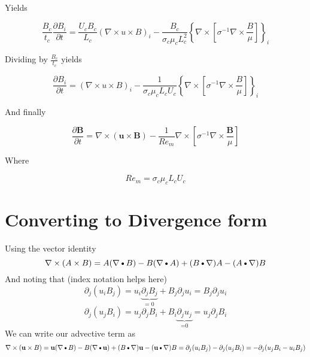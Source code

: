 \documentclass[11pt]{article}
\newcommand{\B}{\mathbf{B}}
\newcommand{\PD}{\partial}
\newcommand{\BM}{\frac{\mathbf{B}}{\mu}}
\newcommand{\U}{\mathbf{u}}
\newcommand{\SII}{\sigma^{-1}}
\newcommand{\DOT}{\text{\textbullet}}
\begin{document}
Yields

\begin{equation}
	\frac{B_c}{t_c} 
	\frac{\PD B_i}{\PD t} 
	= 
	\frac{U_c B_c}{L_c}
	(\nabla \times u \times B)_i
	- 
	\frac{B_c}{\sigma_c \mu_c L_c^2}
	\left\{
	\nabla \times 
	\left[ \SII
	\nabla \times \frac{B}{\mu} \right]
	\right\}_i
\end{equation}

Dividing by $\frac{B_c}{t_c}$ yields

\begin{equation}
	\frac{\PD B_i}{\PD t} 
	= 
	(\nabla \times u \times B)_i
	- 
	\frac{1}{\sigma_c \mu_c L_c U_c}
	\left\{
	\nabla \times 
	\left[ \SII
	\nabla \times \frac{B}{\mu} \right]
	\right\}_i
\end{equation}

And finally

\begin{equation}
	\boxed{
	\frac{\PD \B}{\PD t} = 
	\nabla \times (\U \times \B)
	- 
	\frac{1}{Re_m}
	\nabla \times 
	\left[ \SII
	\nabla \times \BM \right]
	}
\end{equation}

Where

\begin{equation}
	Re_m = \sigma_c \mu_c L_c U_c
\end{equation}


\section{Converting to Divergence form}

Using the vector identity
\begin{equation}
	\nabla \times (A\times B) = 
	A(\nabla \DOT B) 
	- B(\nabla \DOT A)
	+(B \DOT \nabla)A - (A \DOT \nabla)B
\end{equation}
And noting that (index notation helps here)
\begin{equation}
	\PD_j (u_i B_j) = 
	u_i \underbrace{\PD_j B_j}_\text{= 0} + B_j \PD_j u_i
	= B_j \PD_j u_i
\end{equation}
\begin{equation}
	\PD_j (u_j B_i) = 
	u_j \PD_j B_i + B_i \underbrace{\PD_j u_j}_\text{=0}
	= u_j \PD_j B_i
\end{equation}
We can write our advective term as
\begin{equation}
	\nabla \times (\U \times B) 
	= \U(\nabla \DOT B) 
	- B(\nabla \DOT \U)
	+ (B \DOT \nabla)\U
	- (\U \DOT \nabla)B
	=
	\PD_j (u_i B_j) - \PD_j (u_j B_i)
	=
	-\PD_j (u_j B_i - u_i B_j)
\end{equation}
\end{document}
